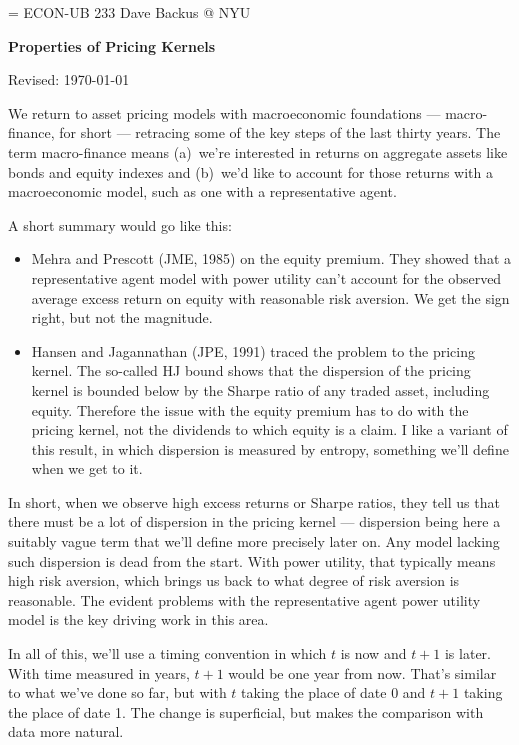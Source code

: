 \documentclass[11pt]{article}
\begin{document}
\parskip=\bigskipamount
\parindent=0.0in
\thispagestyle{empty}
{\large ECON-UB 233 \hfill Dave Backus @ NYU}

\bigskip\bigskip
\centerline{\Large \bf Properties of Pricing Kernels}
\centerline{Revised: \today}

\bigskip
We return to asset pricing models with macroeconomic foundations ---
macro-finance, for short ---
retracing some of the key steps of the last thirty years.
The term macro-finance means
(a)~we're interested in returns on aggregate assets like bonds and equity indexes
and (b)~we'd like to account for those returns with a macroeconomic model,
such as one with a representative agent.

A short summary would go like this:
%
\begin{itemize}
\item Mehra and Prescott (JME, 1985) on the equity premium.
They showed that a representative agent model with power utility
can't account for the observed average excess return on equity
with reasonable risk aversion.
We get the sign right, but not the magnitude.
\item Hansen and Jagannathan (JPE, 1991) traced the problem to the pricing kernel.
The so-called HJ bound shows that the dispersion of the pricing kernel
is bounded below by the Sharpe ratio of any traded asset, including equity.
Therefore the issue with the equity premium has to do with the pricing kernel,
not the dividends to which equity is a claim.
I like a variant of this result, in which dispersion is measured
by entropy, something we'll define when we get to it.
\end{itemize}
%
In short, when we observe high excess returns or Sharpe ratios,
they tell us that there must be a lot of dispersion in the pricing kernel ---
dispersion being here a suitably vague term that we'll define more precisely later on.
Any model lacking such dispersion is dead from the start.
With power utility, that typically means high risk aversion,
which brings us back to what degree of risk aversion is reasonable.
The evident problems with the representative agent power utility model
is the key driving work in this area.  

In all of this, we'll use a timing convention in which $t$ is now
and $t+1$ is later.
With time measured in years, $t+1$ would be one year from now.
That's similar to what we've done so far,
but with $t$ taking the place of date 0 and $t+1$ taking the place of date 1.
The change is superficial, but makes the comparison with data
more natural.
\end{document}
